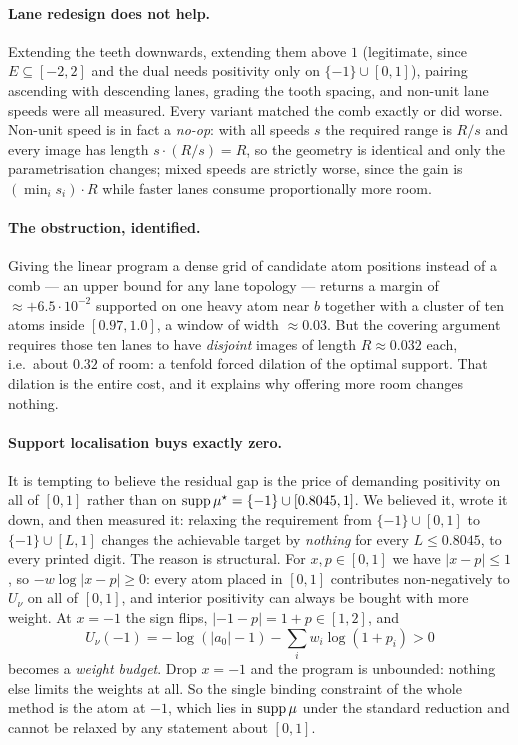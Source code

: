 \documentclass[11pt]{article}
\begin{document}
\paragraph{Lane redesign does not help.} Extending the teeth downwards,
extending them above $1$ (legitimate, since $E\subseteq[-2,2]$ and the
dual needs positivity only on $\{-1\}\cup[0,1]$), pairing ascending with
descending lanes, grading the tooth spacing, and non-unit lane speeds
were all measured. Every variant matched the comb exactly or did worse.
Non-unit speed is in fact a \emph{no-op}: with all speeds $s$ the
required range is $R/s$ and every image has length $s\cdot(R/s)=R$, so
the geometry is identical and only the parametrisation changes; mixed
speeds are strictly worse, since the gain is $(\min_i s_i)\cdot R$ while
faster lanes consume proportionally more room.

\paragraph{The obstruction, identified.} Giving the linear program a
dense grid of candidate atom positions instead of a comb --- an upper
bound for any lane topology --- returns a margin of $\approx+6.5
\cdot10^{-2}$ supported on one heavy atom near $b$ together with a
cluster of ten atoms inside $[0.97,1.0]$, a window of width $\approx
0.03$. But the covering argument requires those ten lanes to have
\emph{disjoint} images of length $R\approx0.032$ each, i.e.\ about
$0.32$ of room: a tenfold forced dilation of the optimal support. That
dilation is the entire cost, and it explains why offering more room
changes nothing.

\paragraph{Support localisation buys exactly zero.} It is tempting to
believe the residual gap is the price of demanding positivity on all of
$[0,1]$ rather than on $\operatorname{supp}\mu^\star=\{-1\}\cup[0.8045,1]$. We
believed it, wrote it down, and then measured it: relaxing the
requirement from $\{-1\}\cup[0,1]$ to $\{-1\}\cup[L,1]$ changes the
achievable target by \emph{nothing} for every $L\le0.8045$, to every
printed digit. The reason is structural. For $x,p\in[0,1]$ we have
$\lvert x-p\rvert\le1$, so $-w\log\lvert x-p\rvert\ge0$: every atom
placed in $[0,1]$ contributes non-negatively to $U_\nu$ on all of
$[0,1]$, and interior positivity can always be bought with more weight.
At $x=-1$ the sign flips, $\lvert-1-p\rvert=1+p\in[1,2]$, and
\[
  U_\nu(-1)=-\log(\lvert a_0\rvert-1)-\sum_i w_i\log(1+p_i)>0
\]
becomes a \emph{weight budget}. Drop $x=-1$ and the program is
unbounded: nothing else limits the weights at all. So the single binding
constraint of the whole method is the atom at $-1$, which lies in
$\operatorname{supp}\mu$ under the standard reduction and cannot be relaxed by any
statement about $[0,1]$.
\end{document}
